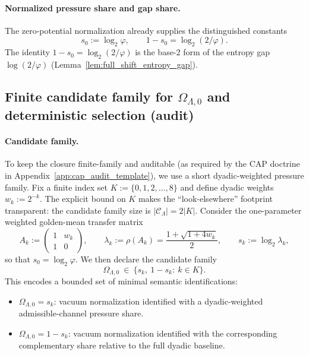 \paragraph{Normalized pressure share and gap share.}
\MathTag The zero-potential normalization already supplies the distinguished constants
\begin{equation}
\label{eq:lambda_pressure_share_def}
s_0:=\log_2\varphi,
\qquad
1-s_0=\log_2(2/\varphi).
\end{equation}
\MathTag The identity $1-s_0=\log_2(2/\varphi)$ is the base-2 form of the entropy gap $\log(2/\varphi)$ (Lemma~\ref{lem:full_shift_entropy_gap}).

\subsection{Finite candidate family for \texorpdfstring{$\Omega_{\Lambda,0}$}{OmegaLambda0} and deterministic selection (audit)}
\label{subsec:lambda_pressure_candidate_family}

\paragraph{Candidate family.}
\AuditTag To keep the closure finite-family and auditable (as required by the CAP doctrine in Appendix~\ref{app:cap_audit_template}), we use a short dyadic-weighted pressure family.
Fix a finite index set $K:=\{0,1,2,\dots,8\}$ and define dyadic weights $w_k:=2^{-k}$.
\AuditTag The explicit bound on $K$ makes the ``look-elsewhere'' footprint transparent: the candidate family size is $|\mathcal{C}_\Lambda|=2|K|$.
Consider the one-parameter weighted golden-mean transfer matrix
\begin{equation}
\label{eq:lambda_pressure_weighted_matrix}
A_k
:=
\begin{pmatrix}
1 & w_k\\
1 & 0
\end{pmatrix},
\qquad
\lambda_k:=\rho(A_k)=\frac{1+\sqrt{1+4w_k}}{2},
\qquad
s_k:=\log_2\lambda_k,
\end{equation}
so that $s_0=\log_2\varphi$.
We then declare the candidate family
\begin{equation}
\label{eq:lambda_pressure_candidate_family}
\Omega_{\Lambda,0}\ \in\ \bigl\{s_k,\ 1-s_k:\ k\in K\bigr\}.
\end{equation}
\AuditTag This encodes a bounded set of minimal semantic identifications:
\begin{itemize}
\item $\Omega_{\Lambda,0}=s_k$: vacuum normalization identified with a dyadic-weighted admissible-channel pressure share.
\item $\Omega_{\Lambda,0}=1-s_k$: vacuum normalization identified with the corresponding complementary share relative to the full dyadic baseline.
\end{itemize}

